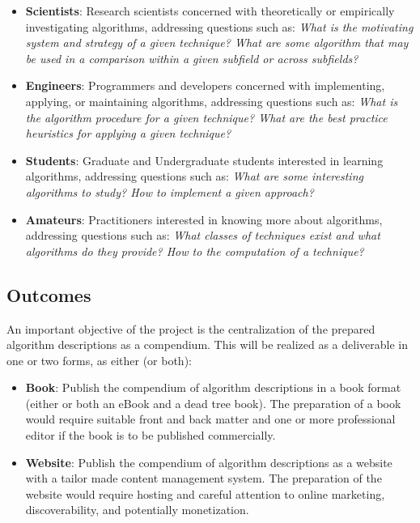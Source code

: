 \documentclass[a4paper, 11pt]{article}
\begin{document}
\begin{itemize}
	\item \textbf{Scientists}: Research scientists concerned with theoretically or empirically investigating algorithms, addressing questions such as: \emph{What is the motivating system and strategy of a given technique? What are some algorithm that may be used in a comparison within a given subfield or across subfields?}
	\item \textbf{Engineers}: Programmers and developers concerned with implementing, applying, or maintaining algorithms, addressing questions such as: \emph{What is the algorithm procedure for a given technique?	What are the best practice heuristics for applying a given technique?}
	\item \textbf{Students}: Graduate and Undergraduate students interested in learning algorithms, addressing questions such as: \emph{What are some interesting algorithms to study? How to implement a given approach?}
	\item \textbf{Amateurs}: Practitioners interested in knowing more about algorithms, addressing questions such as: \emph{What classes of techniques exist and what algorithms do they provide? How to  the computation of a technique?}
\end{itemize}

\subsection{Outcomes}
An important objective of the project is the centralization of the prepared algorithm descriptions as a compendium. This will be realized as a deliverable in one or two forms, as either (or both):

\begin{itemize}
	\item \textbf{Book}: Publish the compendium of algorithm descriptions in a book format (either or both an eBook and a dead tree book). The preparation of a book would require suitable front and back matter and one or more professional editor if the book is to be published commercially.
	\item \textbf{Website}: Publish the compendium of algorithm descriptions as a website with a tailor made content management system. The preparation of the website would require hosting and careful attention to online marketing, discoverability, and potentially monetization.
\end{itemize} 
\end{document}
